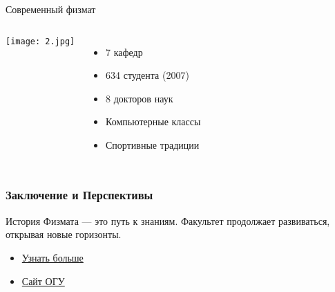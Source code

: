 \documentclass[pdf,hyperref={unicode}, aspectratio=43, serif,11pt]{beamer}
\begin{document}
\begin{frame}{Современный физмат}
    \begin{columns}
        \texttt{[image: 2.jpg]}
        
        \begin{itemize}
            \item 7 кафедр
            \item 634 студента (2007)
            \item 8 докторов наук
            \item Компьютерные классы
            \item Спортивные традиции
        \end{itemize}
    \end{columns}
    
    \vspace{0.5cm}
    \centering
\end{frame}

\begin{frame}
\frametitle{Заключение и Перспективы}
{\small История Физмата — это путь к знаниям. Факультет продолжает развиваться, открывая новые горизонты.}
\begin{itemize}
    \item {\small \href{https://phys-math.ru/history/start}{Узнать больше}}
    \item {\small \href{https://oreluniver.ru}{Сайт ОГУ}}
\end{itemize}
\end{frame}
\end{document}
